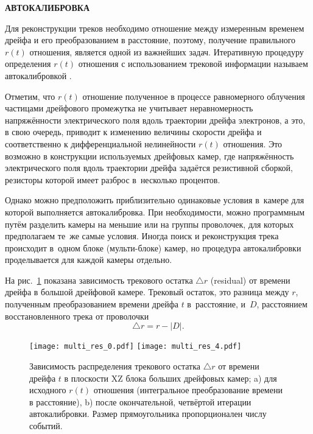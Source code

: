 \vspace* {0.5cm}
\begin{center} \bf{АВТОКАЛИБРОВКА} \end{center}

Для реконструкции треков необходимо отношение между измеренным временем дрейфа
и его преобразованием в расстояние, поэтому, получение правильного $r(t)$
отношения, является одной из важнейших задач. Итеративную процедуру определения
$r(t)$ отношения с использованием трековой информации называем автокалибровкой
\cite{amelung:2004}.

Отметим, что $r(t)$ отношение полученное в процессе равномерного облучения
частицами дрейфового промежутка не учитывает неравномерность напряжённости
электрического поля вдоль траектории дрейфа электронов, а это, в свою очередь,
приводит к изменению величины скорости дрейфа и соответственно
к дифференциальной нелинейности $r(t)$ отношения. Это возможно в конструкции
используемых дрейфовых камер, где напряжённость электрического поля вдоль
траектории дрейфа задаётся резистивной сборкой, резисторы которой имеет разброс
в~несколько процентов.

Однако  можно предположить приблизительно одинаковые условия в~камере для
которой выполняется автокалибровка. При необходимости, можно программным путём
разделить камеры на меньшие или на группы проволочек, для которых предполагаем
те~же самые условия. Иногда поиск и реконструкция трека происходит в~одном
блоке (мульти-блоке) камер, но процедура автокалибровки проделывается для
каждой камеры отдельно.

На рис.~\ref{fig:multi_res} показана зависимость трекового остатка
$\triangle r$ (residual) от времени дрейфа в большой дрейфовой камере. Трековый
остаток, это разница между $r$, полученным преобразованием времени дрейфа $t$
в~расстояние, и~$D$, расстоянием восстановленного трека от проволочки
\[
\triangle r = r - |D|.
\]

\begin{figure}[h]
  \begin{center}
    \texttt{[image: multi\_res\_0.pdf]}
    \texttt{[image: multi\_res\_4.pdf]}
    \caption {Зависимость распределения трекового остатка $\triangle r$ от
      времени дрейфа $t$ в плоскости XZ блока больших дрейфовых камер;
      a) для исходного $r(t)$ отношения (интегральное преобразование времени
      в расстояние), b) после окончательной, четвёртой итерации автокалибровки.
      Размер прямоугольника пропорционален числу событий.}
    \label{fig:multi_res}
  \end{center}
\end{figure}

